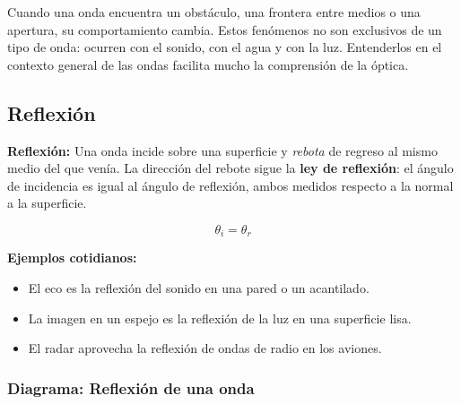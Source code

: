 \begin{seccion}
Cuando una onda encuentra un obstáculo, una frontera entre medios o una apertura, su comportamiento cambia. Estos fenómenos no son exclusivos de un tipo de onda: ocurren con el sonido, con el agua y con la luz. Entenderlos en el contexto general de las ondas facilita mucho la comprensión de la óptica.
\end{seccion}

\subsection{Reflexión}

\begin{seccion}
\begin{definicion}
\textbf{Reflexión:} Una onda incide sobre una superficie y \textit{rebota} de regreso al mismo medio del que venía. La dirección del rebote sigue la \textbf{ley de reflexión}: el ángulo de incidencia es igual al ángulo de reflexión, ambos medidos respecto a la normal a la superficie.
\end{definicion}

$$\theta_i = \theta_r$$

\textbf{Ejemplos cotidianos:}
\begin{itemize}
    \item El eco es la reflexión del sonido en una pared o un acantilado.
    \item La imagen en un espejo es la reflexión de la luz en una superficie lisa.
    \item El radar aprovecha la reflexión de ondas de radio en los aviones.
\end{itemize}
\end{seccion}

\subsubsection{Diagrama: Reflexión de una onda}

